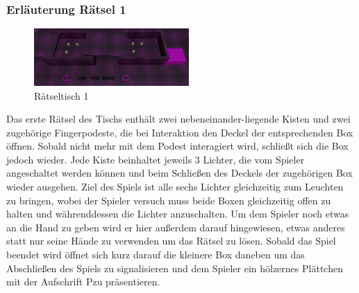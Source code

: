 \subsubsection{Erläuterung Rätsel 1}
\begin{figure}
	\vspace*{-0.5cm}
	\includegraphics[width=5.9cm]{Pictures/Tisch1}
	\caption{Rätseltisch 1}
	\vspace*{-0.5cm}
	\label{fig:tisch1}
\end{figure}
Das erste Rätsel des Tischs enthält zwei nebeneinander-liegende Kisten und zwei zugehörige Fingerpodeste, die bei Interaktion den Deckel der entsprechenden Box öffnen. Sobald nicht mehr mit dem Podest interagiert wird, schließt sich die Box jedoch wieder. Jede Kiste beinhaltet jeweils 3 Lichter, die vom Spieler angeschaltet werden können und beim Schließen des Deckels der zugehörigen Box wieder ausgehen. Ziel des Spiels ist alle sechs Lichter gleichzeitig zum Leuchten zu bringen, wobei der Spieler versuch muss beide Boxen gleichzeitig offen zu halten und währenddessen die Lichter anzuschalten. Um dem Spieler noch etwas an die Hand zu geben wird er hier außerdem darauf hingewiesen, etwas anderes statt nur seine Hände zu verwenden um das Rätsel zu lösen. Sobald das Spiel beendet wird öffnet sich kurz darauf die kleinere Box daneben um das Abschließen des Spiels zu signalisieren und dem Spieler ein hölzernes Plättchen mit der Aufschrift \dq P\dq zu präsentieren.\\

